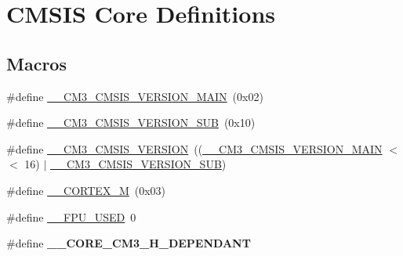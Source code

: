 \hypertarget{group___c_m_s_i_s__core__definitions}{\section{C\-M\-S\-I\-S Core Definitions}
\label{group___c_m_s_i_s__core__definitions}
}
\subsection*{Macros}
\begin{DoxyCompactItemize}
\item 
\#define \hyperlink{group___c_m_s_i_s__core__definitions_gac1c1120e9fe082fac8225c60143ac79a}{\-\_\-\-\_\-\-C\-M3\-\_\-\-C\-M\-S\-I\-S\-\_\-\-V\-E\-R\-S\-I\-O\-N\-\_\-\-M\-A\-I\-N}~(0x02)
\item 
\#define \hyperlink{group___c_m_s_i_s__core__definitions_ga9ff7a998d4b8b3c87bfaca6e78607950}{\-\_\-\-\_\-\-C\-M3\-\_\-\-C\-M\-S\-I\-S\-\_\-\-V\-E\-R\-S\-I\-O\-N\-\_\-\-S\-U\-B}~(0x10)
\item 
\#define \hyperlink{group___c_m_s_i_s__core__definitions_gaf888c651cd8c93fd25364f9e74306a1c}{\-\_\-\-\_\-\-C\-M3\-\_\-\-C\-M\-S\-I\-S\-\_\-\-V\-E\-R\-S\-I\-O\-N}~((\hyperlink{group___c_m_s_i_s__core__definitions_gac1c1120e9fe082fac8225c60143ac79a}{\-\_\-\-\_\-\-C\-M3\-\_\-\-C\-M\-S\-I\-S\-\_\-\-V\-E\-R\-S\-I\-O\-N\-\_\-\-M\-A\-I\-N} $<$$<$ 16) $\vert$ \hyperlink{group___c_m_s_i_s__core__definitions_ga9ff7a998d4b8b3c87bfaca6e78607950}{\-\_\-\-\_\-\-C\-M3\-\_\-\-C\-M\-S\-I\-S\-\_\-\-V\-E\-R\-S\-I\-O\-N\-\_\-\-S\-U\-B})
\item 
\#define \hyperlink{group___c_m_s_i_s__core__definitions_ga63ea62503c88acab19fcf3d5743009e3}{\-\_\-\-\_\-\-C\-O\-R\-T\-E\-X\-\_\-\-M}~(0x03)
\item 
\#define \hyperlink{group___c_m_s_i_s__core__definitions_gaa167d0f532a7c2b2e3a6395db2fa0776}{\-\_\-\-\_\-\-F\-P\-U\-\_\-\-U\-S\-E\-D}~0
\item 
\hypertarget{group___c_m_s_i_s__core__definitions_ga8fbb068b8003976152cf1d6197778e95}{\#define {\bfseries \-\_\-\-\_\-\-C\-O\-R\-E\-\_\-\-C\-M3\-\_\-\-H\-\_\-\-D\-E\-P\-E\-N\-D\-A\-N\-T}}\label{group___c_m_s_i_s__core__definitions_ga8fbb068b8003976152cf1d6197778e95}


\end{DoxyCompactItemize}
